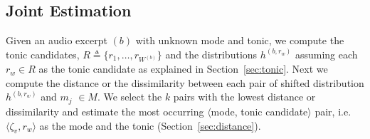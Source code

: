 \documentclass{sig-alternate}
\begin{document}
\subsection{Joint Estimation}\label{sec:joint}
Given an audio excerpt $(b)$ with unknown mode and tonic, we compute the tonic candidates, $R \triangleq \{r_1, \dots, r_{W^{(b)}}\}$ and the distributions $h^{(b, r_w)}$ assuming each $r_w \in R$ as the tonic candidate as explained in Section~\ref{sec:tonic}. Next we compute the distance or the dissimilarity between each pair of shifted distribution $h^{(b, r_w)}$ and $m_j$ $\in M$. We select the $k$ pairs with the lowest distance or dissimilarity and estimate the most occurring $\langle$mode, tonic candidate$\rangle$ pair, i.e.  $\langle \zeta_v, r_w \rangle$ as the mode and the tonic (Section~\ref{sec:distance}).
\end{document}
